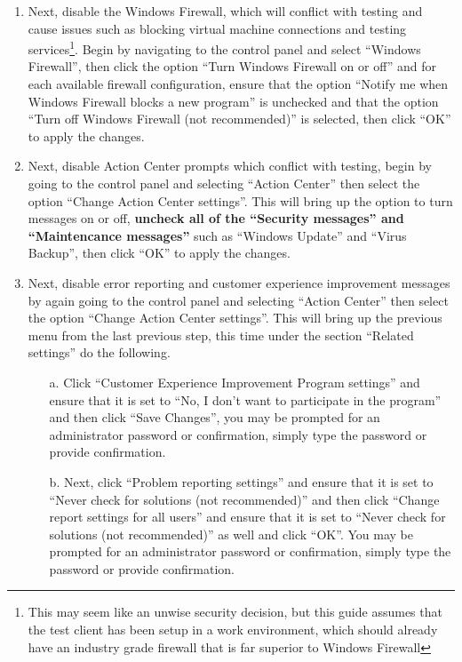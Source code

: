 \begin{enumerate}
\item	Next, disable the Windows Firewall, which will conflict with testing and cause issues such as blocking virtual machine connections 
		and testing services\footnote{This may seem like an unwise security decision, but this guide assumes that the test client has been
		setup in a work environment, which should already have an industry grade firewall that is far superior to Windows Firewall}.
		Begin by navigating to the control panel and select ``Windows Firewall'', then click the option ``Turn Windows Firewall on
		or off'' and for each available firewall configuration, ensure that the option ``Notify me when Windows Firewall blocks a new
		program'' is unchecked and that the option ``Turn off Windows Firewall (not recommended)'' is selected, then click ``OK'' to
		apply the changes.
		
\item	Next, disable Action Center prompts which conflict with testing, begin by going to the control panel and selecting ``Action Center''
		then select the option ``Change Action Center settings''. This will bring up the option to turn messages on or off, {\bf uncheck all of 
		the ``Security messages'' and ``Maintencance messages''} such as ``Windows Update'' and ``Virus Backup'', then click ``OK'' to apply
		the changes.
		
\item	Next, disable error reporting and customer experience improvement messages by again going to the control panel and selecting 
		``Action Center'' then select the option ``Change Action Center settings''. This will bring up the previous menu from the last
		previous step, this time under the section ``Related settings'' do the following.
\begin{itemize}	
\item[a.]	Click ``Customer Experience Improvement Program settings'' and ensure that it is set to ``No, I don't want to participate in
			the program'' and then click ``Save Changes'', you may be prompted for an administrator password or confirmation, simply type
			the password or provide confirmation.
			
\item[b.]	Next, click ``Problem reporting settings'' and ensure that it is set to ``Never check for solutions (not recommended)'' and
			then click ``Change report settings for all users'' and ensure that it is set to ``Never check for solutions (not recommended)''
			as well and click ``OK''. You may be prompted for an administrator password or confirmation, simply type the password or provide
			confirmation.
\end{itemize}	


\end{enumerate}
